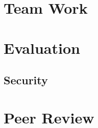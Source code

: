 \documentclass[11pt,a4paper]{report}
\begin{document}
\chapter{Team Work}

\chapter{Evaluation}


\section{Security}


\chapter{Peer Review}


{}
\end{document}
